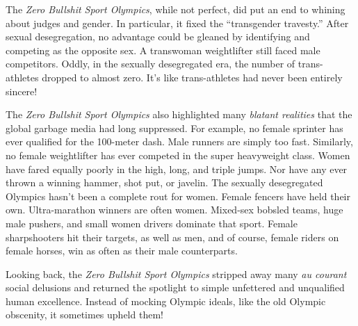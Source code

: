 The \emph{Zero Bullshit Sport Olympics}, while not perfect, did put an
end to whining about judges and gender. In particular, it fixed the
``transgender travesty.'' After sexual desegregation, no advantage could
be gleaned by identifying and competing as the opposite sex. A
transwoman weightlifter still faced male competitors. Oddly, in the
sexually desegregated era, the number of trans-athletes dropped to
almost zero. It's like trans-athletes had never been entirely sincere!

The \emph{Zero Bullshit Sport Olympics} also highlighted many
\emph{blatant realities} that the global garbage media had long
suppressed. For example, no female sprinter has ever qualified for the
100-meter dash. Male runners are simply too fast. Similarly, no female
weightlifter has ever competed in the super heavyweight class. Women
have fared equally poorly in the high, long, and triple jumps. Nor have
any ever thrown a winning hammer, shot put, or javelin. The sexually
desegregated Olympics hasn't been a complete rout for women. Female
fencers have held their own. Ultra-marathon winners are often women.
Mixed-sex bobsled teams, huge male pushers, and small women drivers
dominate that sport. Female sharpshooters hit their targets, as well as
men, and of course, female riders on female horses, win as often as
their male counterparts.

Looking back, the \emph{Zero Bullshit Sport Olympics} stripped away many
\emph{au courant} social delusions and returned the spotlight to simple
unfettered and unqualified human excellence. Instead of mocking Olympic
ideals, like the old Olympic obscenity, it sometimes upheld them!



%
 